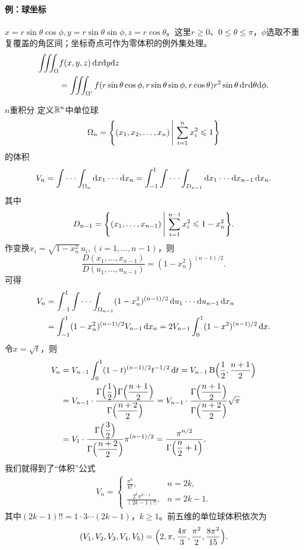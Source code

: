 \paragraph{例：球坐标}$x = r\sin\theta\cos\phi,y = r\sin\theta\sin\phi,z = r\cos\theta$。这里$r \geq 0$、$0 \leq \theta \leq \pi$，$\phi$选取不重复覆盖的角区间；坐标奇点可作为零体积的例外集处理。
\begin{equation}\label{eq:calc-spherical-integral}
	\begin{aligned}
		\iiint_\Omega & f(x,y,z)\mathop{}\!\mathrm{d} x\mathrm{d} y\mathrm{d} z                                                                                   \\
					  & = \iiint_{\Omega'}f(r\sin\theta\cos\phi,r\sin\theta\sin\phi,r\cos\theta)r^2\sin\theta\mathop{}\!\mathrm{d} r\mathrm{d}\theta\mathrm{d}\phi.
	\end{aligned}
\end{equation}
\begin{example}{$n$重积分}{}
	定义$\mathbb{R}^n$中单位球
	\[
		\Omega_n = \Biggl\{(x_1,x_2,\ldots,x_n)\,\Bigg\vert\,\sum_{i=1}^nx_i^2 \leqslant 1\Biggr\}
	\]
	的体积
	\[
		V_n = \int \cdot \cdot \cdot \int_{\Omega_n}\mathop{}\!\mathrm{d} x_1 \cdot \cdot \cdot \mathop{}\!\mathrm{d} x_n = \int_{-1}^1\int \cdot \cdot \cdot \int_{D_{n-1}}\mathop{}\!\mathrm{d} x_1 \cdot \cdot \cdot \mathop{}\!\mathrm{d} x_{n-1}\mathop{}\!\mathrm{d} x_n.
	\]
	其中
	\[
		D_{n-1} = \Biggl\{(x_1,\ldots,x_{n-1})\,\Bigg\vert\,\sum_{i=1}^{n-1}x_i^2 \leqslant 1 - x_n^2\Biggr\}.
	\]
	作变换$x_i = \sqrt{1 - x_n^2}\,u_i,(i = 1,\ldots,n - 1)$，则
	\[
		\frac{D(x_1,\ldots,x_{n-1})}{D(u_1,\ldots,u_{n-1})} = (1 - x_n^2)^{(n-1)/2}.
	\]
	可得
	\begin{align*}
		V_n & = \int_{-1}^1\int \cdot \cdot \cdot \int_{\Omega_{n-1}}(1 - x_n^2)^{(n-1)/2}\mathop{}\!\mathrm{d} u_1 \cdot \cdot \cdot \mathop{}\!\mathrm{d} u_{n-1}\mathop{}\!\mathrm{d} x_n \\
			& = \int_{-1}^1(1 - x_n^2)^{(n-1)/2}V_{n-1}\mathop{}\!\mathrm{d} x_n = 2V_{n-1}\int_0^1(1 - x^2)^{(n-1)/2}\mathop{}\!\mathrm{d} x.
	\end{align*}
	令$x = \sqrt t$，则
	\begin{align*}
		V_n & = V_{n-1}\int_0^1(1 - t)^{(n-1)/2}t^{-1/2}\mathop{}\!\mathrm{d} t = V_{n-1}\operatorname{B}\Bigl(\frac12,\frac{n + 1}2\Bigr)\\
			& = V_{n-1} \cdot \frac{\displaystyle \Gamma\Bigl(\frac12\Bigr)\Gamma\Bigl(\frac{n + 1}2\Bigr)}{\displaystyle \Gamma\Bigl(\frac{n + 2}2\Bigr)} = V_{n-1} \cdot \frac{\displaystyle \Gamma\Bigl(\frac{n + 1}2\Bigr)}{\displaystyle \Gamma\Bigl(\frac{n + 2}2\Bigr)}\sqrt\pi \\
			& = V_1 \cdot \frac{\displaystyle \Gamma\Bigl(\frac32\Bigr)}{\displaystyle \Gamma\Bigl(\frac{n + 2}2\Bigr)}\pi^{(n-1)/2} = \frac{\displaystyle \pi^{n/2}}{\displaystyle \Gamma\Bigl(\frac n2 + 1\Bigr)}.
	\end{align*}
	我们就得到了“体积”公式
	\begin{align}
		V_n =
		\begin{cases}
			\frac{\pi^k}{k!},        & n = 2k,   \\[
		2ex]
			\frac{2^k\pi^{k-1}}{(2k - 1)!!}, & n = 2k - 1.
		\end{cases}
	\end{align}
	其中$(2k - 1)!! = 1 \cdot 3\cdots(2k - 1)$，$k \geq 1$。前五维的单位球体积依次为
	\[
		(V_1,V_2,V_3,V_4,V_5)
		= \Bigl(2,\pi,\frac{4\pi}3,\frac{\pi^2}2,\frac{8\pi^2}{15}\Bigr).
	\]
\end{example}
